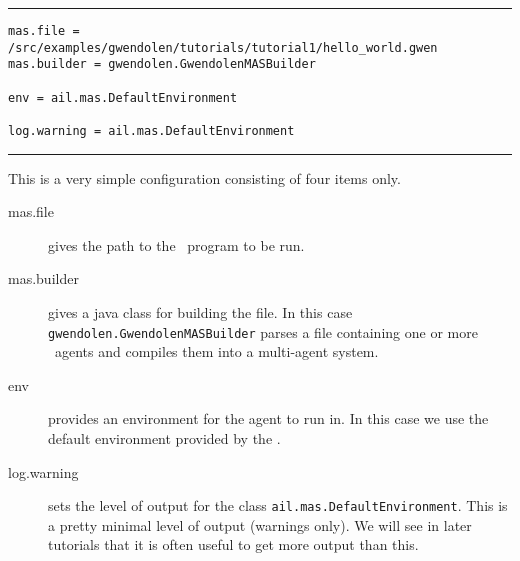 \noindent\rule{\textwidth}{1pt}
\begin{verbatim}
mas.file = /src/examples/gwendolen/tutorials/tutorial1/hello_world.gwen
mas.builder = gwendolen.GwendolenMASBuilder

env = ail.mas.DefaultEnvironment

log.warning = ail.mas.DefaultEnvironment
\end{verbatim}
\rule{\textwidth}{1pt}

This is a very simple configuration consisting of four items only.
\begin{description}
\item[mas.file] gives the path to the \gwendolen\ program to be run.
\item[mas.builder] gives a java class for building the file.  In this case \texttt{gwendolen.GwendolenMASBuilder} parses a file containing one or more \gwendolen\ agents and compiles them into a multi-agent system.
\item[env] provides an environment for the agent to run in.  In this case we use the default environment provided by the \ail.
\item[log.warning] sets the level of output for the class \texttt{ail.mas.DefaultEnvironment}.  This is a pretty minimal level of output (warnings only).  We will see in later tutorials that it is often useful to get more output than this.
\end{description}

